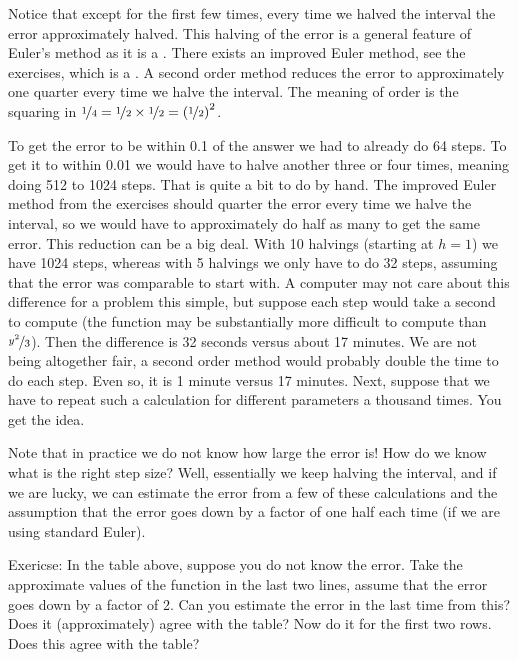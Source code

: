 Notice that except for the first few times, every time we halved 
the interval the error approximately halved.
This halving of the error is a general feature of Euler's method as it is a
\emph{}.
There exists an improved Euler method, see the exercises,
which is a .
A second order method
reduces the error to approximately one
quarter every time we halve the interval.  The meaning of
 order is the squaring in $\nicefrac{1}{4} = \nicefrac{1}{2} \times
\nicefrac{1}{2} = {(\nicefrac{1}{2})}^2$.

To get the error to be within 0.1 of the answer we had to already
do 64 steps.  To get it to within 0.01 we would have to halve another three or
four times, meaning doing 512 to 1024 steps.  That is quite a bit to do by
hand.  The improved Euler method from the exercises
should quarter the
error every time we halve the interval, so we would have to approximately do half as many
 to get the same error.  This reduction can be a big deal.  With 10
halvings (starting at $h=1$) we have 1024 steps, whereas with 5 halvings
we only have to do 32 steps, assuming that the error was comparable to start
with.  A computer may not care about this
difference for a problem this simple, but suppose each step would take a
second to compute (the function may be substantially more difficult to compute
than $\nicefrac{y^2}{3}$).  Then the difference is 32 seconds versus about 17 minutes.
We are not being altogether fair, a second order method would probably
double the time to do each step.  Even so, it is 1 minute versus 17 minutes.
Next, suppose that we have to repeat such a calculation for different
parameters a thousand times.  You get the idea.

Note that in practice we do not know how large the error is!
How do we know what is
the right step size?  Well, essentially we keep halving the interval, and if we
are lucky, we can estimate the error from a few of these calculations and the
assumption that the error goes down by a factor of one half each time (if
we are using standard Euler).

Exericse:
In the table above, suppose you do not know the error.  Take
the approximate values of the function in the last two lines,
assume that the error goes down by a factor of 2.  Can you estimate the
error in the last time from this?  Does it (approximately) agree with the
table?  Now do it for the first two rows.  Does this agree with the table?

